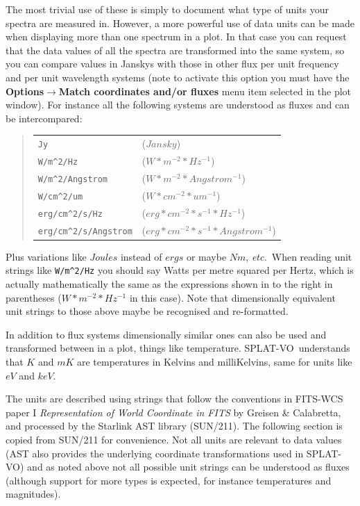\documentclass[twoside,11pt]{article}
\newcommand{\latexhtml}[2]{#1}
\newcommand{\xref}[3]{#1}
\renewcommand{\_}{\texttt{\symbol{95}}}
\newcommand{\SPLAT}{\textsf{SPLAT-VO}}
\newcommand{\submenuitem}[2]{\latexhtml{\textbf{#1$\rightarrow$#2}}{\textbf{#1->#2}}}
\newcommand{\hitext}[1]{\texttt{#1}}
\newcommand{\etc}{\textit{etc.}}
\begin{document}
The most trivial use of these is simply to document what type of units your
spectra are measured in. However, a more powerful use of data units can be
made when displaying more than one spectrum in a plot.  In that case you can
request that the data values of all the spectra are transformed into the same
system, so you can compare values in Janskys with those in other flux per unit
frequency and per unit wavelength systems (note to activate this option you
must have the
\submenuitem{Options}{Match coordinates and/or fluxes} menu item selected
in the plot window). For instance all the following systems are understood as
fluxes and can be intercompared:
\begin{quote}
\begin{tabular}{ll}
\verb+Jy+                  & ($Jansky$)                                \\
\verb+W/m^2/Hz+            & ($W*m^{-2}*Hz^{-1}$)                      \\
\verb+W/m^2/Angstrom+      & ($W*m^{-2}*Angstrom^{-1}$)                \\
\verb+W/cm^2/um+           & ($W*cm^{-2}*um^{-1}$)                     \\
\verb+erg/cm^2/s/Hz+       & ($erg*cm^{-2}*s^{-1}*Hz^{-1}$)            \\
\verb+erg/cm^2/s/Angstrom+ & ($erg*cm^{-2}*s^{-1}*Angstrom^{-1}$)
\end{tabular}
\end{quote}
Plus variations like $Joules$ instead of $ergs$ or maybe $N m$, \etc\ When
reading unit strings like \verb+W/m^2/Hz+ you should say Watts per metre
squared per Hertz, which is actually mathematically the same as the
expressions shown in to the right in parentheses (\hitext{$W*m^{-2}*Hz^{-1}$}
in this case). Note that dimensionally equivalent unit strings to those above
maybe be recognised and re-formatted.

In addition to flux systems dimensionally similar ones can also be used and
transformed between in a plot, things like temperature. \SPLAT\ understands
that $K$ and $mK$ are temperatures in Kelvins and milliKelvins, same for units
like $eV$ and $keV$.

The units are described using strings that follow the conventions in FITS-WCS
paper I \textit{Representation of World Coordinate in FITS} by Greisen \&
Calabretta, and processed by the Starlink AST library
(\xref{SUN/211}{sun211}{}).
The following section is copied from SUN/211 for convenience. Not all units
are relevant to data values (AST also provides the underlying coordinate
transformations used in \SPLAT) and as noted above not all possible unit
strings can be understood as fluxes (although support for more types is
expected, for instance temperatures and magnitudes).
\end{document}
